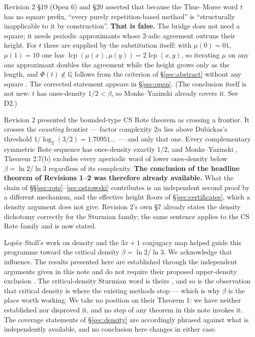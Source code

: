 \documentclass[11pt]{article}
\newcommand{\Q}{\mathbb{Q}}
\begin{document}
\begin{description}[leftmargin=2.5em,style=nextline]

\item[D1 --- The Thue--Morse scope claim is withdrawn.] Revision 2 \S19 (Open 6) and \S20 asserted
that because the Thue--Morse word $t$ has no square prefix, ``every purely repetition-based
method'' is ``structurally inapplicable to it by construction''. \textbf{That is false.} The bridge
does not need a square; it needs periodic approximants whose 2-adic agreement outruns their height.
For $t$ these are supplied by the substitution itself: with $\mu(0)=01$, $\mu(1)=10$ one has
$\operatorname{lcp}(\mu(x),\mu(y))=2\operatorname{lcp}(x,y)$, so iterating $\mu$ on any one
approximant doubles the agreement while the height grows only as the length, and
$\Phi(t)\notin\Q$ follows from the criterion of \S\ref{sec:abstract} without any square
\cite{Phase9bTM}. The corrected statement appears in \S\ref{sec:open}. (The conclusion itself is not
new: $t$ has ones-density $1/2<\beta$, so Monks--Yazinski \cite{MonksYazinski2004} already
covers it. See D2.)

\item[D2 --- The novelty framing of the CS Rote theorem is corrected.] Revision 2 presented the
bounded-type CS Rote theorem as crossing a frontier. It crosses the \emph{counting} frontier ---
factor complexity $2n$ lies above Dubickas's threshold $1/\log_2(3/2)=1.70951\ldots$ --- and only
that one. Every complementary symmetric Rote sequence has ones-density exactly $1/2$, and
Monks--Yazinski \cite{MonksYazinski2004}, Theorem 2.7(b) excludes every aperiodic word of lower
ones-density below $\beta=\ln2/\ln3$ regardless of its complexity. \textbf{The conclusion of the
headline theorem of Revisions 1--2 was therefore already available.} What the chain of
\S\S\ref{sec:rote}--\ref{sec:ostrowski} contributes is an independent second proof by a different
mechanism, and the effective height floors of \S\ref{sec:certificates}, which a density argument
does not give. Revision 2's own \S7 already states the density dichotomy correctly for the Sturmian
family; the same sentence applies to the CS Rote family and is now stated.

\item[D3 --- Lop\'ez--Stoll: acknowledgement, and a statement of what is not used.]
Lop\'ez--Stoll's work on density and the $3x+1$ conjugacy map helped guide this programme toward the
critical density $\beta=\ln2/\ln3$. We acknowledge that influence. The results presented here are
established through the independent arguments given in this note and do not require their proposed
upper-density exclusion \cite{LopezStoll2021}. The critical-density Sturmian word is theirs
\cite{LopezStoll2009}, and so is the observation that critical density is where the existing methods
stop --- which is why $\beta$ is the place worth working. We take no position on their Theorem 1: we
have neither established nor disproved it, and no step of any theorem in this note invokes it. The
coverage statements of \S\ref{sec:density} are accordingly phrased against what is independently
available, and no conclusion here changes in either case.


\end{description}
\end{document}

